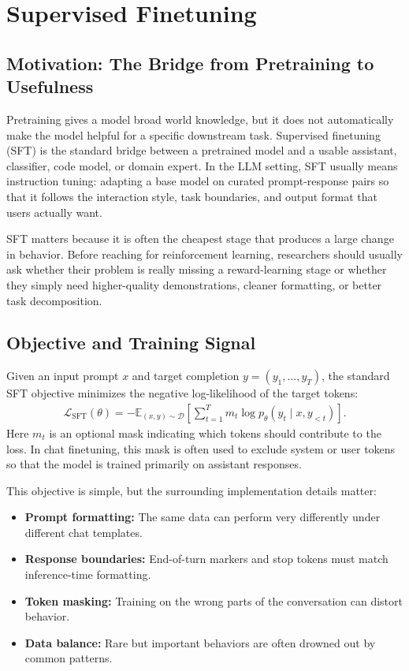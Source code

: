 \documentclass[class=article,crop=false]{standalone}
\begin{document}
\section{Supervised Finetuning}
\label{sec:sft}

\subsection{Motivation: The Bridge from Pretraining to Usefulness}
\label{sec:sft:motivation}

Pretraining gives a model broad world knowledge, but it does not automatically make the model helpful for a specific downstream task. Supervised finetuning (SFT) is the standard bridge between a pretrained model and a usable assistant, classifier, code model, or domain expert. In the LLM setting, SFT usually means instruction tuning: adapting a base model on curated prompt-response pairs so that it follows the interaction style, task boundaries, and output format that users actually want.

SFT matters because it is often the cheapest stage that produces a large change in behavior. Before reaching for reinforcement learning, researchers should usually ask whether their problem is really missing a reward-learning stage or whether they simply need higher-quality demonstrations, cleaner formatting, or better task decomposition.

\subsection{Objective and Training Signal}
\label{sec:sft:objective}

Given an input prompt $x$ and target completion $y = (y_1, \dots, y_T)$, the standard SFT objective minimizes the negative log-likelihood of the target tokens:
\begin{align}
  \mathcal{L}_{\mathrm{SFT}}(\theta)
  =
  -\mathbb{E}_{(x,y)\sim\mathcal{D}}
  \left[
    \sum_{t=1}^{T}
    m_t \log p_{\theta}(y_t \mid x, y_{<t})
  \right].
\end{align}
Here $m_t$ is an optional mask indicating which tokens should contribute to the loss. In chat finetuning, this mask is often used to exclude system or user tokens so that the model is trained primarily on assistant responses.

This objective is simple, but the surrounding implementation details matter:
\begin{itemize}
  \item \textbf{Prompt formatting:} The same data can perform very differently under different chat templates.
  \item \textbf{Response boundaries:} End-of-turn markers and stop tokens must match inference-time formatting.
  \item \textbf{Token masking:} Training on the wrong parts of the conversation can distort behavior.
  \item \textbf{Data balance:} Rare but important behaviors are often drowned out by common patterns.
\end{itemize}
\end{document}
